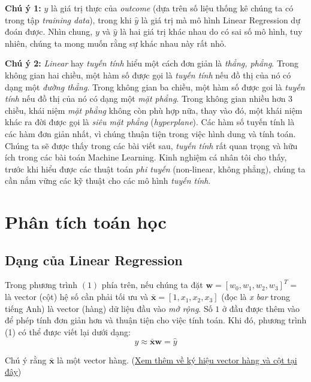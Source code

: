 \textbf{Chú ý 1:} $y$ là giá trị thực của \textit{outcome} (dựa trên số liệu thống kê chúng ta có trong tập \textit{training data}), trong khi $\hat{y}$ là giá trị mà mô hình Linear Regression dự đoán được. Nhìn chung, $y$ và $\hat{y}$ là hai giá trị khác nhau do có sai số mô hình, tuy nhiên, chúng ta mong muốn rằng sự khác nhau này rất nhỏ. 
 
\textbf{Chú ý 2:} \textit{Linear} hay \textit{tuyến tính} hiểu một cách đơn giản là \textit{thẳng, phẳng}. Trong không gian hai chiều, một hàm số được gọi là \textit{tuyến tính} nếu đồ thị của nó có dạng một \textit{đường thẳng}. Trong không gian ba chiều, một hàm số được goi là \textit{tuyến tính} nếu đồ thị của nó có dạng một \textit{mặt phẳng}. Trong không gian nhiều hơn 3 chiều, khái niệm \textit{mặt phẳng} không còn phù hợp nữa, thay vào đó, một khái niệm khác ra đời được gọi là \textit{siêu mặt phẳng} (\textit{hyperplane}). Các hàm số tuyến tính là các hàm đơn giản nhất, vì chúng thuận tiện trong việc hình dung và tính toán. Chúng ta sẽ được thấy trong các bài viết sau, \textit{tuyến tính} rất quan trọng và hữu ích trong các bài toán Machine Learning. Kinh nghiệm cá nhân tôi cho thấy, trước khi hiểu được các thuật toán \textit{phi tuyến} (non-linear, không phẳng), chúng ta cần nắm vững các kỹ thuật cho các mô hình \textit{tuyến tính}. 
 
 
 
 
 
\section{Phân tích toán học}
 
 
 
 
\subsection{Dạng của Linear Regression }
 
Trong phương trình $(1)$ phía trên, nếu chúng ta đặt $\mathbf{w} = [w_0, w_1, w_2, w_3]^T = $ là vector (cột) hệ số cần phải tối ưu và $\mathbf{\bar{x}} = [1, x_1, x_2, x_3]$ (đọc là \textit{x bar} trong tiếng Anh) là vector (hàng) dữ liệu đầu vào \textit{mở rộng}. Số $1$ ở đầu được thêm vào để phép tính đơn giản hơn và thuận tiện cho việc tính toán. Khi đó, phương trình (1) có thể được viết lại dưới dạng: 
$$y \approx \mathbf{\bar{x}}\mathbf{w} = \hat{y}$$ 
 
Chú ý rằng $\mathbf{\bar{x}}$ là một vector hàng. (\href{http://machinelearningcoban.com/math/#luu-y-ve-ky-hieu}{Xem thêm về ký hiệu vector hàng và cột tại đây}) 
 
